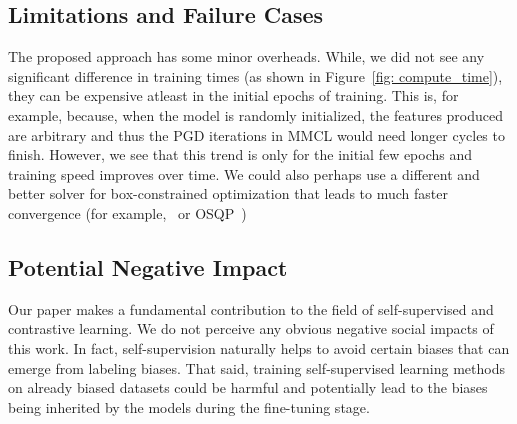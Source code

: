 \documentclass[letterpaper]{article} \usepackage{aaai22}  \usepackage{times}  \usepackage{helvet}  \usepackage{courier}  \usepackage[hyphens]{url}  \usepackage{graphicx} \urlstyle{rm} \def\UrlFont{\rm}  \usepackage{natbib}  \usepackage{caption} \DeclareCaptionStyle{ruled}{labelfont=normalfont,labelsep=colon,strut=off} \frenchspacing  \setlength{\pdfpagewidth}{8.5in}  \setlength{\pdfpageheight}{11in}
\begin{document}
\subsection{Limitations and Failure Cases}
The proposed approach has some minor overheads. While, we did not see any significant difference in training times (as shown in Figure~\ref{fig: compute_time}), they can be expensive atleast in the initial epochs of training. This is, for example, because, when the model is randomly initialized, the features produced are arbitrary and thus the PGD iterations in MMCL would need longer cycles to finish. However, we see that this trend is only for the initial few epochs and training speed improves over time. We could also perhaps use a different and better solver for box-constrained optimization that leads to much faster convergence (for example,~\cite{kiSrDh12} or OSQP~\cite{osqp-gpu})

\subsection{Potential Negative Impact}
Our paper makes a fundamental contribution to the field of self-supervised and contrastive learning. We do not perceive any obvious negative social impacts of this work. In fact, self-supervision naturally helps to avoid certain biases that can emerge from labeling biases. That said, training self-supervised learning methods on already biased datasets could be harmful and potentially lead to the biases being inherited by the models during the fine-tuning stage. 



\end{document}
